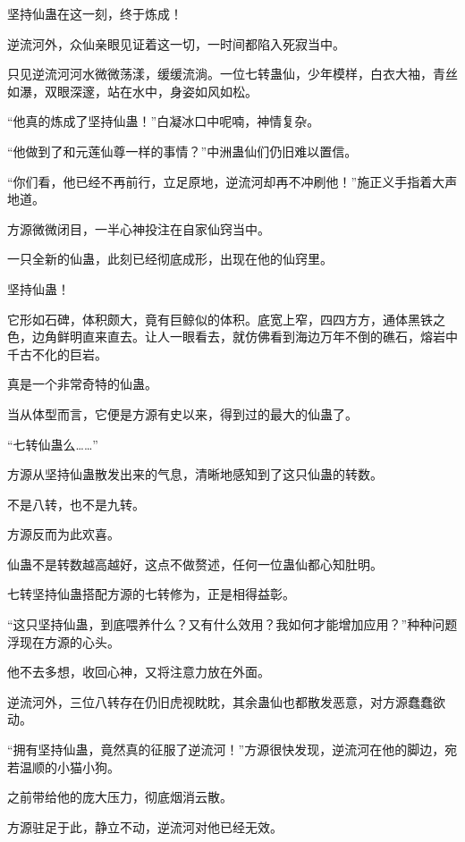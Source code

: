 
\begin{this_body}

坚持仙蛊在这一刻，终于炼成！

逆流河外，众仙亲眼见证着这一切，一时间都陷入死寂当中。

只见逆流河河水微微荡漾，缓缓流淌。一位七转蛊仙，少年模样，白衣大袖，青丝如瀑，双眼深邃，站在水中，身姿如风如松。

“他真的炼成了坚持仙蛊！”白凝冰口中呢喃，神情复杂。

“他做到了和元莲仙尊一样的事情？”中洲蛊仙们仍旧难以置信。

“你们看，他已经不再前行，立足原地，逆流河却再不冲刷他！”施正义手指着大声地道。

方源微微闭目，一半心神投注在自家仙窍当中。

一只全新的仙蛊，此刻已经彻底成形，出现在他的仙窍里。

坚持仙蛊！

它形如石碑，体积颇大，竟有巨鲸似的体积。底宽上窄，四四方方，通体黑铁之色，边角鲜明直来直去。让人一眼看去，就仿佛看到海边万年不倒的礁石，熔岩中千古不化的巨岩。

真是一个非常奇特的仙蛊。

当从体型而言，它便是方源有史以来，得到过的最大的仙蛊了。

“七转仙蛊么……”

方源从坚持仙蛊散发出来的气息，清晰地感知到了这只仙蛊的转数。

不是八转，也不是九转。

方源反而为此欢喜。

仙蛊不是转数越高越好，这点不做赘述，任何一位蛊仙都心知肚明。

七转坚持仙蛊搭配方源的七转修为，正是相得益彰。

“这只坚持仙蛊，到底喂养什么？又有什么效用？我如何才能增加应用？”种种问题浮现在方源的心头。

他不去多想，收回心神，又将注意力放在外面。

逆流河外，三位八转存在仍旧虎视眈眈，其余蛊仙也都散发恶意，对方源蠢蠢欲动。

“拥有坚持仙蛊，竟然真的征服了逆流河！”方源很快发现，逆流河在他的脚边，宛若温顺的小猫小狗。

之前带给他的庞大压力，彻底烟消云散。

方源驻足于此，静立不动，逆流河对他已经无效。


\end{this_body}
